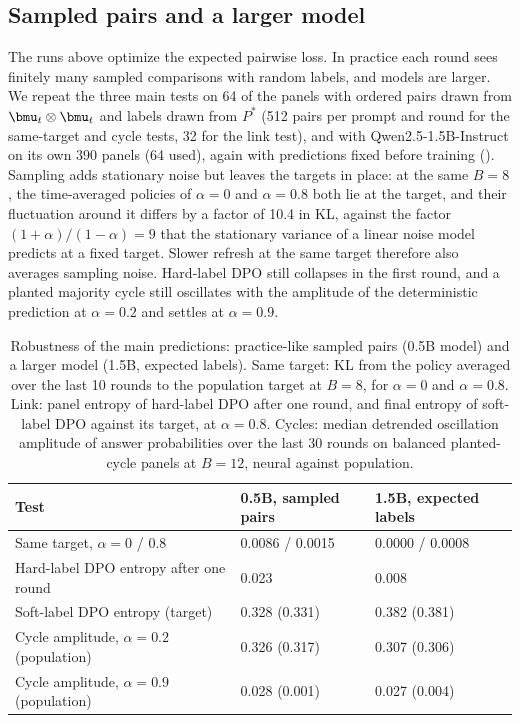 
\subsection{Sampled pairs and a larger model}
\label{sec:exp-robust}
The runs above optimize the expected pairwise loss. In practice each round sees finitely many sampled comparisons with random labels, and models are larger. We repeat the three main tests on 64 of the panels with ordered pairs drawn from $\bmu_t\otimes\bmu_t$ and labels drawn from $P^*$ (512 pairs per prompt and round for the same-target and cycle tests, 32 for the link test), and with Qwen2.5-1.5B-Instruct on its own 390 panels (64 used), again with predictions fixed before training (). Sampling adds stationary noise but leaves the targets in place: at the same $B=8$, the time-averaged policies of $\alpha=0$ and $\alpha=0.8$ both lie at the target, and their fluctuation around it differs by a factor of 10.4 in KL, against the factor $(1+\alpha)/(1-\alpha)=9$ that the stationary variance of a linear noise model predicts at a fixed target. Slower refresh at the same target therefore also averages sampling noise. Hard-label DPO still collapses in the first round, and a planted majority cycle still oscillates with the amplitude of the deterministic prediction at $\alpha=0.2$ and settles at $\alpha=0.9$.

\begin{table}[t]
\centering
\caption{Robustness of the main predictions: practice-like sampled pairs (0.5B model) and a larger model (1.5B, expected labels). Same target: KL from the policy averaged over the last 10 rounds to the population target at $B=8$, for $\alpha=0$ and $\alpha=0.8$. Link: panel entropy of hard-label DPO after one round, and final entropy of soft-label DPO against its target, at $\alpha=0.8$. Cycles: median detrended oscillation amplitude of answer probabilities over the last 30 rounds on balanced planted-cycle panels at $B=12$, neural against population.}
\label{tab:exp-robust}
\small
\begin{tabular}{lll}
\toprule
Test & 0.5B, sampled pairs & 1.5B, expected labels\\
\midrule
Same target, $\alpha=0$ / $0.8$ & 0.0086 / 0.0015 & 0.0000 / 0.0008\\
Hard-label DPO entropy after one round & 0.023 & 0.008\\
Soft-label DPO entropy (target) & 0.328 (0.331) & 0.382 (0.381)\\
Cycle amplitude, $\alpha=0.2$ (population) & 0.326 (0.317) & 0.307 (0.306)\\
Cycle amplitude, $\alpha=0.9$ (population) & 0.028 (0.001) & 0.027 (0.004)\\
\bottomrule
\end{tabular}
\end{table}
